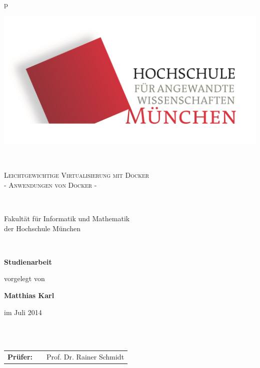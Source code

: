 \begin{center}
\begin{tabular}{p{\textwidth}}


\begin{center}
\includegraphics[scale=0.17]{img/logos.jpg}
\end{center}


\\

\begin{center}
\LARGE{\textsc{
Leichtgewichtige Virtualisierung mit Docker \\  \large{- Anwendungen von Docker -}
}}
\end{center}

\\


\begin{center}
\large{Fakultät für Informatik und Mathematik \\
der Hochschule München \\}
\end{center}

\\

\begin{center}
\textbf{\Large{Studienarbeit}}
\end{center}



\begin{center}
vorgelegt von
\end{center}

\begin{center}
\large{\textbf{Matthias Karl}} \\
\end{center}

\begin{center}
\large{im Juli 2014}
\end{center}

\\

\\

\begin{center}
\begin{tabular}{lll}
\textbf{Prüfer:} & & Prof. Dr. Rainer Schmidt\\
\end{tabular}
\end{center}

\end{tabular}
\end{center}